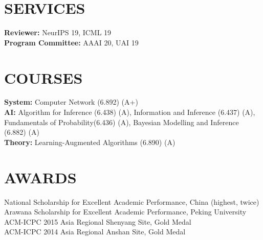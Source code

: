 \documentclass[margin]{res}
\newcommand{\Bullet}[1]{{\raisebox{0.25ex}{\tiny$\bullet$\ }}{#1}\\}
\begin{document}
\begin{resume}
\section{SERVICES}
\textbf{Reviewer:} NeurIPS 19, ICML 19\\
\textbf{Program Committee:} AAAI 20, UAI 19

\section{COURSES}
\textbf{System:} Computer Network (6.892) (A+) \\
\textbf{AI:} Algorithm for Inference (6.438) (A), Information and Inference (6.437) (A), Fundamentals of Probability(6.436) (A), Bayesian Modelling and Inference (6.882) (A) \\
\textbf{Theory:} Learning-Augmented Algorithms (6.890) (A)

\section{AWARDS}
    \Bullet{National Scholarship for Excellent Academic Performance, China (highest, twice)}
    \Bullet{Arawana Scholarship for Excellent Academic Performance, Peking University}
    \Bullet{ACM-ICPC 2015 Asia Regional Shenyang Site, Gold Medal}
    \Bullet{ACM-ICPC 2014 Asia Regional Anshan Site, Gold Medal}


\end{resume}
\end{document}
